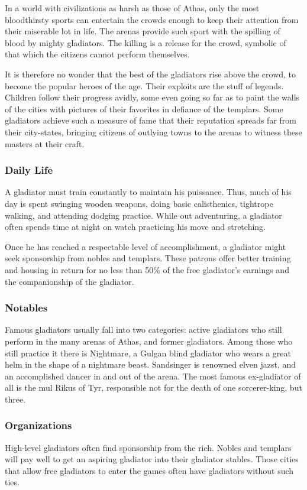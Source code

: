 In a world with civilizations as harsh as those of Athas, only the most bloodthirsty sports can entertain the crowds enough to keep their attention from their miserable lot in life. The arenas provide such sport with the spilling of blood by mighty gladiators. The killing is a release for the crowd, symbolic of that which the citizens cannot perform themselves.

It is therefore no wonder that the best of the gladiators rise above the crowd, to become the popular heroes of the age. Their exploits are the stuff of legends. Children follow their progress avidly, some even going so far as to paint the walls of the cities with pictures of their favorites in defiance of the templars. Some gladiators achieve such a measure of fame that their reputation spreads far from their city-states, bringing citizens of outlying towns to the arenas to witness these masters at their craft.

\subsubsection{Daily Life}
A gladiator must train constantly to maintain his puissance. Thus, much of his day is spent swinging wooden weapons, doing basic calisthenics, tightrope walking, and attending dodging practice. While out adventuring, a gladiator often spends time at night on watch practicing his move and stretching.

Once he has reached a respectable level of accomplishment, a gladiator might seek sponsorship from nobles and templars. These patrons offer better training and housing in return for no less than 50\% of the free gladiator's earnings and the companionship of the gladiator.

\subsubsection{Notables}
Famous gladiators usually fall into two categories: active gladiators who still perform in the many arenas of Athas, and former gladiators. Among those who still practice it there is Nightmare, a Gulgan blind gladiator who wears a great helm in the shape of a nightmare beast. Sandsinger is renowned elven jazst, and an accomplished dancer in and out of the arena. The most famous ex-gladiator of all is the mul Rikus of Tyr, responsible not for the death of one sorcerer-king, but three.

\subsubsection{Organizations}
High-level gladiators often find sponsorship from the rich. Nobles and templars will pay well to get an aspiring gladiator into their gladiator stables. Those cities that allow free gladiators to enter the games often have gladiators without such ties.

